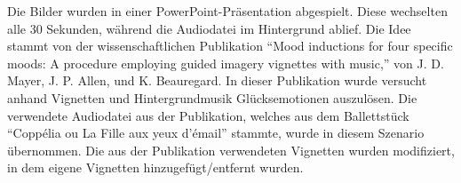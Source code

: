 Die Bilder wurden in einer PowerPoint-Präsentation abgespielt. 
Diese wechselten alle 30 Sekunden, während die Audiodatei im Hintergrund ablief.
Die Idee stammt von der wissenschaftlichen Publikation ``Mood inductions for four specific moods: A procedure employing guided imagery vignettes with music,'' von J. D. Mayer, J. P. Allen, und K. Beauregard. 
In dieser Publikation wurde versucht anhand Vignetten und Hintergrundmusik Glücksemotionen auszulösen.
Die verwendete Audiodatei aus der Publikation, welches aus dem Ballettstück ``Coppélia ou La Fille aux yeux d'émail'' stammte, wurde in diesem Szenario übernommen. 
Die aus der Publikation verwendeten Vignetten wurden modifiziert, in dem eigene Vignetten hinzugefügt/entfernt wurden.

